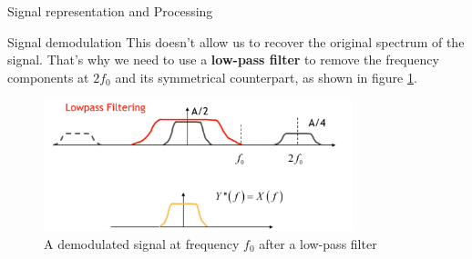 \begin{section}{Signal representation and Processing}
\begin{subsection}{Signal demodulation}
      This doesn't allow us to recover the original spectrum of the signal.
      That's why we need to use a \textbf{low-pass filter} to remove the frequency components at
      $2f_0$ and its symmetrical counterpart, as shown in figure \ref{fig:Demodulation3}.\\
      \begin{figure}[h]
        \centering
        \includegraphics[width=0.8\textwidth]{img/wireless/demodulation3.png}
        \caption{A demodulated signal at frequency $f_0$ after a low-pass filter}
        \label{fig:Demodulation3}
      \end{figure}


\end{subsection}
\end{section}
